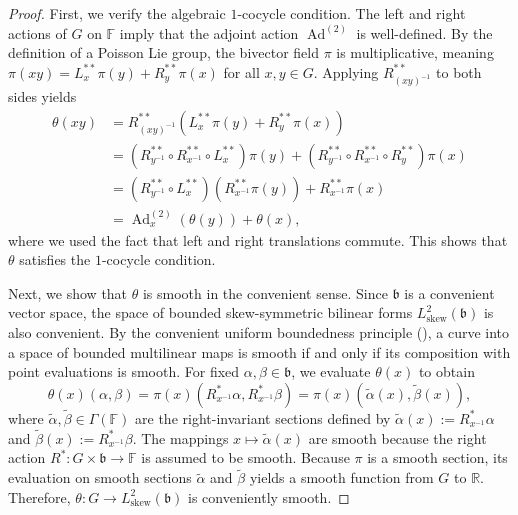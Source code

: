 \documentclass[11pt,reqno]{amsart}
\theoremstyle{definition}
\numberwithin{equation}{section}
\begin{document}
\begin{proof}
First, we verify the algebraic $1$-cocycle condition. The left and right actions of $G$ on $\mathbb{F}$ imply that the adjoint action $\operatorname{Ad}^{(2)}$ is well-defined. By the definition of a Poisson Lie group, the bivector field $\pi$ is multiplicative, meaning $\pi(xy) = L_{x}^{**}\pi(y) + R_{y}^{**}\pi(x)$ for all $x,y \in G$. Applying $R_{(xy)^{-1}}^{**}$ to both sides yields
\begin{align*}
\theta(xy) &= R_{(xy)^{-1}}^{**} \left( L_{x}^{**}\pi(y) + R_{y}^{**}\pi(x) \right) \\
&= \left( R_{y^{-1}}^{**} \circ R_{x^{-1}}^{**} \circ L_{x}^{**} \right) \pi(y) + \left( R_{y^{-1}}^{**} \circ R_{x^{-1}}^{**} \circ R_{y}^{**} \right) \pi(x) \\
&= \left( R_{y^{-1}}^{**} \circ L_{x}^{**} \right) \left( R_{x^{-1}}^{**}\pi(y) \right) + R_{x^{-1}}^{**}\pi(x) \\
&= \operatorname{Ad}^{(2)}_{x}(\theta(y)) + \theta(x),
\end{align*}
where we used the fact that left and right translations commute. This shows that $\theta$ satisfies the $1$-cocycle condition.

Next, we show that $\theta$ is smooth in the convenient sense. Since $\mathfrak{b}$ is a convenient vector space, the space of bounded skew-symmetric bilinear forms $L^2_{\text{skew}}(\mathfrak{b})$ is also convenient. By the convenient uniform boundedness principle (\cite[Theorem 5.18]{20}), a curve into a space of bounded multilinear maps is smooth if and only if its composition with point evaluations is smooth. For fixed $\alpha, \beta \in \mathfrak{b}$, we evaluate $\theta(x)$ to obtain
\[ 
\theta(x)(\alpha, \beta) = \pi(x)(R_{x^{-1}}^*\alpha, R_{x^{-1}}^*\beta) = \pi(x)(\tilde{\alpha}(x), \tilde{\beta}(x)), 
\]
where $\tilde{\alpha}, \tilde{\beta} \in \Gamma(\mathbb{F})$ are the right-invariant sections defined by $\tilde{\alpha}(x) := R_{x^{-1}}^*\alpha$ and $\tilde{\beta}(x) := R_{x^{-1}}^*\beta$. The mappings $x \mapsto \tilde{\alpha}(x)$ are smooth because the right action $R^{*}: G \times \mathfrak{b} \rightarrow \mathbb{F}$ is assumed to be smooth. Because $\pi$ is a smooth section, its evaluation on smooth sections $\tilde{\alpha}$ and $\tilde{\beta}$ yields a smooth function from $G$ to $\mathbb{R}$. Therefore, $\theta: G \rightarrow L^2_{\text{skew}}(\mathfrak{b})$ is conveniently smooth.


\end{proof}
\end{document}
